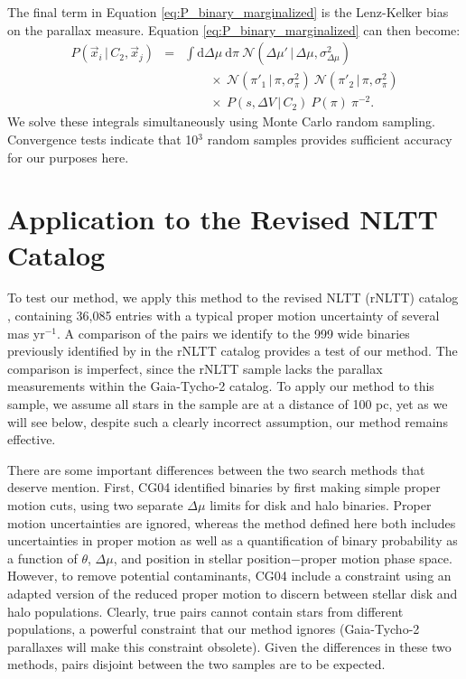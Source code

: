 \documentclass[usenatbib]{mnras}
\newcommand{\given}{\,|\,}
\newcommand{\dd}{\mathrm{d}}
\begin{document}
The final term in Equation \ref{eq:P_binary_marginalized} is the Lenz-Kelker bias on the parallax measure. Equation \ref{eq:P_binary_marginalized} can then become:
\begin{eqnarray}
P(\vec{x}_i \given C_2, \vec{x}_j) &=& \int \dd \Delta \mu\ \dd \pi\ 
\mathcal{N}( \Delta \mu' \given \Delta \mu, \sigma^2_{\Delta \mu} ) \nonumber \\
& & \qquad \times\ \mathcal{N}(\pi'_1 \given \pi, \sigma^2_{\pi})\ 
	\mathcal{N}(\pi'_2 \given \pi, \sigma^2_{\pi}) \nonumber \\
& & \qquad \times\ P(s, \Delta V \given C_2)\ P(\pi)\ \pi^{-2}.
\label{eq:P_binary}
\end{eqnarray}
We solve these integrals simultaneously using Monte Carlo random sampling. Convergence tests indicate that 10$^3$ random samples provides sufficient accuracy for our purposes here.









\section{Application to the Revised NLTT Catalog} \label{sec:rNLTT}


To test our method, we apply this method to the revised NLTT (rNLTT) catalog \citep{gould03, salim03}, containing 36,085 entries with a typical proper motion uncertainty of several mas yr$^{-1}$. A comparison of the pairs we identify to the 999 wide binaries previously identified by \citet[][hereafter CG04]{chaname04} in the rNLTT catalog provides a test of our method. The comparison is imperfect, since the rNLTT sample lacks the parallax measurements within the Gaia-Tycho-2 catalog. To apply our method to this sample, we assume all stars in the sample are at a distance of 100 pc, yet as we will see below, despite such a clearly incorrect assumption, our method remains effective.




There are some important differences between the two search methods that deserve mention. First, CG04 identified binaries by first making simple proper motion cuts, using two separate $\Delta \mu$ limits for disk and halo binaries. Proper motion uncertainties are ignored, whereas the method defined here both includes uncertainties in proper motion as well as a quantification of binary probability as a function of $\theta$, $\Delta \mu$, and position in stellar position$-$proper motion phase space. However, to remove potential contaminants, CG04 include a constraint using an adapted version of the reduced proper motion to discern between stellar disk and halo populations. 
Clearly, true pairs cannot contain stars from different populations, a powerful constraint that our method ignores (Gaia-Tycho-2 parallaxes will make this constraint obsolete). Given the differences in these two methods, pairs disjoint between the two samples are to be expected.
\end{document}
